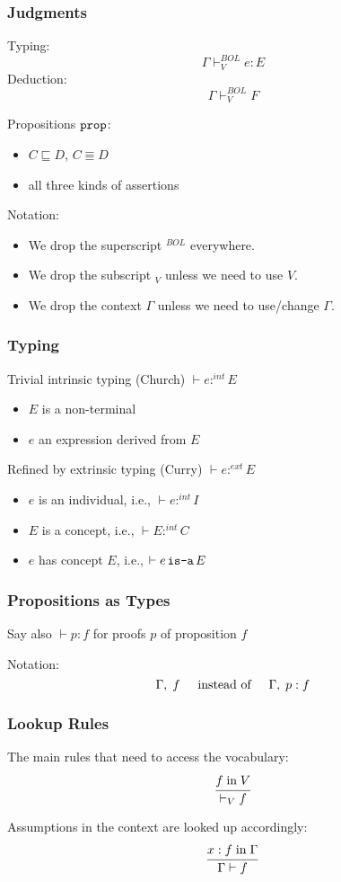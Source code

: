 \begin{frame}\frametitle{Judgments}
Typing:  \[\Gamma\vdash^{BOL}_V e:E\]
Deduction: \[\Gamma\vdash^{BOL}_V F\]

Propositions $\prop$:
\begin{itemize}
\item $C\sqsubseteq D$, $C\Equiv D$
\item all three kinds of assertions
\end{itemize}

Notation:
\begin{itemize}
\item We drop the superscript $^{BOL}$ everywhere.
\item We drop the subscript $_V$ unless we need to use $V$.
\item We drop the context $\Gamma$ unless we need to use/change $\Gamma$.
\end{itemize}
\end{frame}

\begin{frame}\frametitle{Typing}
Trivial intrinsic typing (Church) $\vdash e:^{int} E$
\begin{itemize}
\item $E$ is a non-terminal
\item $e$ an expression derived from $E$
\end{itemize}
\medskip

Refined by extrinsic typing (Curry) $\vdash e :^{ext} E$
\begin{itemize}
\item $e$ is an individual, i.e., $\vdash e :^{int} I$
\item $E$ is a concept, i.e., $\vdash E :^{int} C$
\item $e$ has concept $E$, i.e., $\vdash e \mathop{\texttt{is-a}} E$
\end{itemize}
\end{frame}

\begin{frame}\frametitle{Propositions as Types}
Say also $\vdash p:f$ for proofs $p$ of proposition $f$
\medskip

Notation:
\[\Gamma,\; f \hspace*{.5cm}\text{instead of} \hspace*{.5cm} \Gamma,\;p:f\]
\end{frame}

\begin{frame}\frametitle{Lookup Rules}
The main rules that need to access the vocabulary:
\[\cfrac{f\;\mathrm{in}\; V}{\vdash_V f}\,\]
\medskip

Assumptions in the context are looked up accordingly:
\[\cfrac{x:f\;\mathrm{in}\; \Gamma}{\Gamma\vdash f}\,\]
\end{frame}

